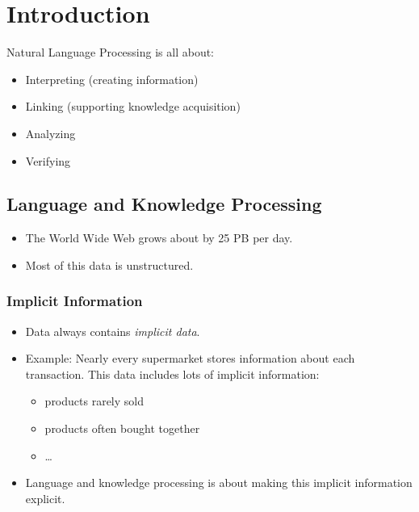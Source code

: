 \chapter{Introduction} %
	Natural Language Processing is all about:
	\begin{itemize}
		\item Interpreting (creating information)
		\item Linking (supporting knowledge acquisition)
		\item Analyzing
		\item Verifying
	\end{itemize}

	\section{Language and Knowledge Processing} %
		\begin{itemize}
			\item The World Wide Web grows about by 25 PB per day.
			\item Most of this data is unstructured.
		\end{itemize}

		\subsection{Implicit Information} %
			\begin{itemize}
				\item Data always contains \textit{implicit data}.
				\item Example: Nearly every supermarket stores information about each transaction. This data includes lots of implicit information:
					\begin{itemize}
						\item products rarely sold
						\item products often bought together
						\item \dots
					\end{itemize}
				\item Language and knowledge processing is about making this implicit information explicit.
			\end{itemize}

